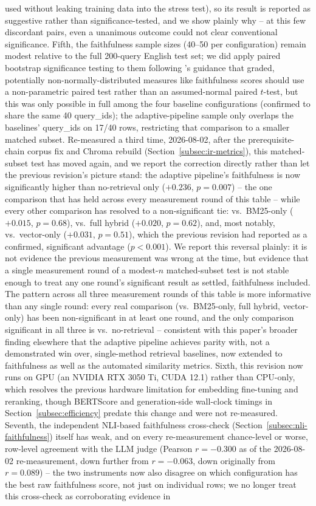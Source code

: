 \documentclass[a4paper,twoside]{article}
\begin{document}
used without leaking training data into the stress test), so its result is reported as suggestive rather than significance-tested, and we show plainly why -- at this few discordant pairs, even a unanimous outcome could not clear conventional significance. Fifth, the faithfulness sample sizes (40--50 per configuration) remain modest relative to the full 200-query English test set; we did apply paired bootstrap significance testing to them following \citet{dror2018hitchhiker}'s guidance that graded, potentially non-normally-distributed measures like faithfulness scores should use a non-parametric paired test rather than an assumed-normal paired $t$-test, but this was only possible in full among the four baseline configurations (confirmed to share the same 40 query\_ids); the adaptive-pipeline sample only overlaps the baselines' query\_ids on 17/40 rows, restricting that comparison to a smaller matched subset. Re-measured a third time, 2026-08-02, after the prerequisite-chain corpus fix and Chroma rebuild (Section~\ref{subsec:ir-metrics}), this matched-subset test has moved again, and we report the correction directly rather than let the previous revision's picture stand: the adaptive pipeline's faithfulness is now significantly higher than no-retrieval only ($+0.236$, $p=0.007$) -- the one comparison that has held across every measurement round of this table -- while every other comparison has resolved to a non-significant tie: vs.\ BM25-only ($+0.015$, $p=0.68$), vs.\ full hybrid ($+0.020$, $p=0.62$), and, most notably, vs.\ vector-only ($+0.031$, $p=0.51$), which the previous revision had reported as a confirmed, significant advantage ($p<0.001$). We report this reversal plainly: it is not evidence the previous measurement was wrong at the time, but evidence that a single measurement round of a modest-$n$ matched-subset test is not stable enough to treat any one round's significant result as settled, faithfulness included. The pattern across all three measurement rounds of this table is more informative than any single round: every real comparison (vs.\ BM25-only, full hybrid, vector-only) has been non-significant in at least one round, and the only comparison significant in all three is vs.\ no-retrieval -- consistent with this paper's broader finding elsewhere that the adaptive pipeline achieves parity with, not a demonstrated win over, single-method retrieval baselines, now extended to faithfulness as well as the automated similarity metrics. Sixth, this revision now runs on GPU (an NVIDIA RTX 3050 Ti, CUDA 12.1) rather than CPU-only, which resolves the previous hardware limitation for embedding fine-tuning and reranking, though BERTScore and generation-side wall-clock timings in Section~\ref{subsec:efficiency} predate this change and were not re-measured. Seventh, the independent NLI-based faithfulness cross-check (Section~\ref{subsec:nli-faithfulness}) itself has weak, and on every re-measurement chance-level or worse, row-level agreement with the LLM judge (Pearson $r=-0.300$ as of the 2026-08-02 re-measurement, down further from $r=-0.063$, down originally from $r=0.089$) -- the two instruments now also disagree on which configuration has the best raw faithfulness score, not just on individual rows; we no longer treat this cross-check as corroborating evidence in 
\end{document}
